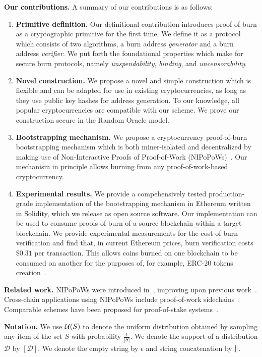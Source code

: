 \noindent
\textbf{Our contributions.}
A summary of our contributions is as follows:
\begin{enumerate}[wide, labelwidth=!, labelindent=0pt, label=(\roman*)]
    \item \textbf{Primitive definition.} Our definitional contribution introduces proof-of-burn as a cryptographic primitive for the first time. We
    define it as a protocol which consists of two algorithms, a burn address \emph{generator} and a burn address \emph{verifier}. We put forth the foundational properties which make for secure burn protocols, namely \emph{unspendability}, \emph{binding}, and \emph{uncensorability}.
    \item \textbf{Novel construction.} We propose a novel and simple construction which is flexible and can be adapted for use in existing cryptocurrencies, as long as they use public key hashes for address generation. To our knowledge, all popular cryptocurrencies are
    compatible with our scheme. We prove our construction secure in the Random Oracle model.
    \item \textbf{Bootstrapping mechanism.} We propose a cryptocurrency proof-of-burn bootstrapping mechanism which is both miner-isolated and decentralized by making use of Non-Interactive Proofs of Proof-of-Work (NIPoPoWs)~\cite{nipopows}. Our mechanism in principle allows burning from any proof-of-work-based cryptocurrency.
    \item \textbf{Experimental results.} We provide a compehensively tested production-grade implementation of the bootstrapping mechanism in Ethereum
    written in Solidity, which we release as open source software. Our implementation can be used to consume proofs of burn of a source blockchain
    within a target blockchain. We provide experimental measurements for the cost of burn verification and find that, in current Ethereum prices,
    burn verification costs $\$0.31$ per transaction.
    This allows coins burned on one blockchain to be consumed on another for the purposes of, for example, ERC-20 tokens creation~\cite{erc20}.
\end{enumerate}

\noindent
\textbf{Related work.}
NIPoPoWs were introduced in~\cite{nipopows}, improving upon previous work~\cite{popow,highway}. Cross-chain applications using NIPoPoWs include proof-of-work sidechains~\cite{pow-sidechains}. Comparable schemes have been proposed for proof-of-stake systems~\cite{pos-sidechains}.


\noindent
\textbf{Notation.} We use $\mathcal{U}(S)$ to denote the uniform distribution
obtained by sampling any item of the set $S$ with probability $\frac{1}{|S|}$.
We denote the support of a distribution $\mathcal{D}$ by $[\mathcal{D}]$.
We denote the empty string by $\epsilon$ and string concatenation by $\mathbin{\|}$.
